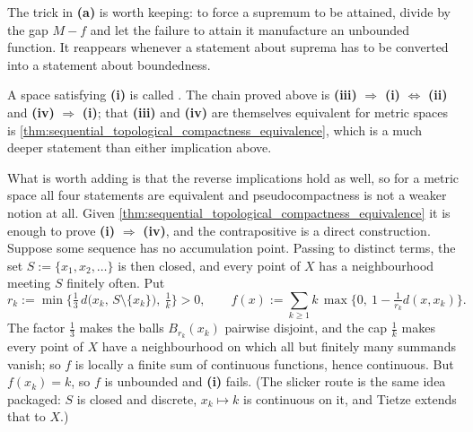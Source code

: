 \begin{exercisesolution}
\begin{remark}
The trick in \textbf{(a)} is worth keeping: to force a supremum to be attained, divide by the gap
$M - f$ and let the failure to attain it manufacture an unbounded function. It reappears whenever a
statement about suprema has to be converted into a statement about boundedness.

A space satisfying \textbf{(i)} is called . The chain proved above is
\textbf{(iii)} $\Rightarrow$ \textbf{(i)} $\Leftrightarrow$ \textbf{(ii)} and \textbf{(iv)}
$\Rightarrow$ \textbf{(i)}; that \textbf{(iii)} and \textbf{(iv)} are themselves equivalent for
metric spaces is \cref{thm:sequential_topological_compactness_equivalence}, which is a much deeper
statement than either implication above.

What is worth adding is that the reverse implications hold as well, so for a metric space all
four statements are equivalent and pseudocompactness is not a weaker notion at all. Given
\cref{thm:sequential_topological_compactness_equivalence} it is enough to prove
\textbf{(i)} $\Rightarrow$ \textbf{(iv)}, and the contrapositive is a direct construction.
Suppose some sequence has no accumulation point. Passing to distinct terms, the set
$S := \{x_1,x_2,\dots\}$ is then closed, and every point of $X$ has a neighbourhood meeting $S$
finitely often. Put
\[r_k := \min\Big\{\tfrac13\,d\big(x_k,\,S\setminus\{x_k\}\big),\ \tfrac1k\Big\} > 0,
  \qquad f(x) := \sum_{k\ge1} k\,\max\Big\{0,\ 1 - \tfrac{1}{r_k}d(x,x_k)\Big\}.\]
The factor $\tfrac13$ makes the balls $B_{r_k}(x_k)$ pairwise disjoint, and the cap $\tfrac1k$
makes every point of $X$ have a neighbourhood on which all but finitely many summands vanish; so
$f$ is locally a finite sum of continuous functions, hence continuous. But $f(x_k) = k$, so $f$
is unbounded and \textbf{(i)} fails. (The slicker route is the same idea packaged: $S$ is closed
and discrete, $x_k \mapsto k$ is continuous on it, and Tietze extends that to $X$.)
\end{remark}
\end{exercisesolution}

